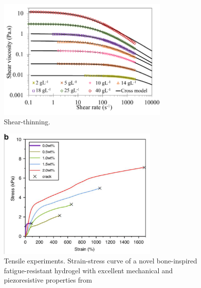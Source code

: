 \begin{figure}[ht!]
    \centering
    \includegraphics[width=0.75\textwidth]{figs/explainMechResponse/alginateShearThinning.png}
    \caption{Shear-thinning\citep{varela-feijooMultiscaleInvestigationViscoelastic2023}.}\label{fig:hydroMechResponse2}
\end{figure}






\begin{figure}[ht!]
    \centering
    \includegraphics[width=0.7\textwidth]{figs/mechResponse/mech_response1.png}
    \caption{Tensile experiments. Strain-stress curve  of a novel bone-inspired fatigue-resistant hydrogel with excellent mechanical and piezoresistive properties from\citep{lyuBoneinspiredGNECHAPAAm2023}}
\end{figure}

